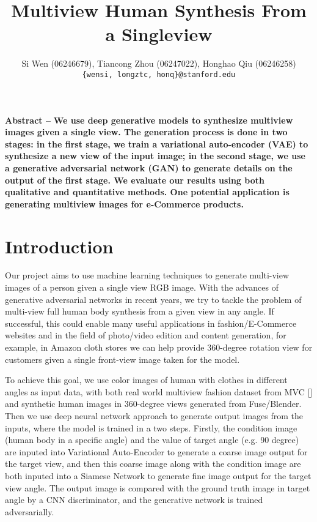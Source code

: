 \documentclass[10pt,conference]{IEEEtran}
\title{Multiview Human Synthesis From a Singleview}
\author{Si Wen (06246679), Tiancong Zhou (06247022), Honghao Qiu (06246258)\\
\texttt{\{wensi, longztc, honq\}{@}stanford.edu}}
\begin{document}
\maketitle

\newcommand{\R}{\mathbb{R}}
\newcommand{\eqnset}[1]{\left.\mbox{$#1$}\quad\quad\right\rbrace}
\newcommand{\tr}{\text{tr}\;}
\renewcommand{\th}{\theta}
\newcommand{\toi}{^{(i)}}


\textbf{Abstract --  }
\textbf{We use deep generative models to synthesize multiview images given a single view. The generation process is done in two stages: in the first stage, we train a variational auto-encoder (VAE) to synthesize a new view of the input image; in the second stage, we use a generative adversarial network (GAN) to generate details on the output of the first stage. We evaluate our results using both qualitative and quantitative methods. One potential application is generating multiview images for e-Commerce products.}


\section{Introduction} 
Our project aims to use machine learning techniques to generate multi-view images of a person given a single view RGB image. With the advances of generative adversarial networks in recent years, we try to tackle the problem of multi-view full human body synthesis from a given view in any angle. If successful, this could enable many useful applications in fashion/E-Commerce websites and in the field of photo/video edition and content generation, for example, in Amazon cloth stores we can help provide 360-degree rotation view for customers given a single front-view image taken for the model. 

To achieve this goal, we use color images of human with clothes in different angles as input data, with both real world multiview fashion dataset from MVC [] and synthetic human images in 360-degree views generated from Fuse/Blender. Then we use deep neural network approach to generate output images from the inputs, where the model is trained in a two steps. Firstly, the condition image (human body in a specific angle) and the value of target angle (e.g. 90 degree) are inputed into Variational Auto-Encoder to generate a coarse image output for the target view, and then this coarse image along with the condition image are both inputed into a Siamese Network to generate fine image output for the target view angle. The output image is compared with the ground truth image in target angle by a CNN discriminator, and the generative network is trained adversarially. 
\end{document}
